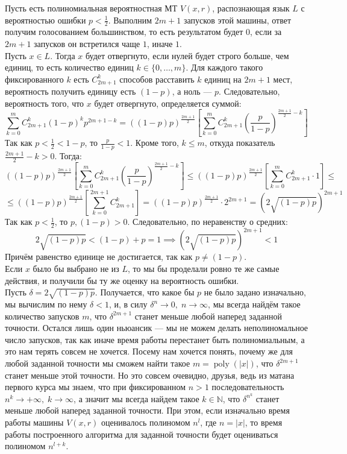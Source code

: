 \documentclass[11pt]{article}
\DeclareMathOperator{\poly}{poly}
\begin{document}
Пусть есть полиномиальная вероятностная МТ $V(x, r)$, распознающая язык $L$ с вероятностью ошибки $p < \frac{1}{2}$. Выполним $2m + 1$ запусков этой машины, ответ получим голосованием большинством, то есть результатом будет $0$, если за $2m + 1$ запусков он встретился чаще $1$, иначе $1$. \\
Пусть $x \in L$. Тогда $x$ будет отвергнуто, если нулей будет строго больше, чем единиц, то есть количество единиц $k \in \{0, \ldots, m\}$. Для каждого такого фиксированного $k$ есть $C_{2m + 1}^k$ способов расставить $k$ единиц на $2m + 1$ мест, вероятность получить единицу есть $(1 - p)$, а ноль --- $p$. Следовательно, вероятность того, что $x$ будет отвергнуто, определяется суммой:
\[\sum_{k = 0}^m C_{2m + 1}^k (1 - p)^k p^{2m + 1 - k} = ((1-p)p)^{\frac{2m + 1}{2}} \left[\sum_{k = 0}^m C_{2m + 1}^k \left(\frac{p}{1 - p}\right)^{\frac{2m + 1}{2} - k}\right]\]
Так как $p < \frac{1}{2} < 1 - p$, то $\frac{p}{1 - p} < 1$.
Кроме того, $k \leq m$, откуда показатель $\frac{2m + 1}{2} - k > 0$. Тогда:
\[((1-p)p)^{\frac{2m + 1}{2}} \left[\sum_{k = 0}^m C_{2m + 1}^k \left(\frac{p}{1 - p}\right)^{\frac{2m + 1}{2} - k}\right] \leq ((1 - p)p)^{\frac{2m + 1}{2}} \left[\sum_{k = 0}^m C_{2m + 1}^k \cdot 1\right] \leq \]
\[\leq ((1 - p)p)^{\frac{2m + 1}{2}} \left[\sum_{k = 0}^{2m + 1} C_{2m + 1}^k\right] = ((1 - p)p)^{\frac{2m + 1}{2}} \cdot 2^{2m + 1} = \left(2\sqrt{(1 - p)p}\right)^{2m + 1}\]
Так как $p < \frac{1}{2}$, то $p, (1 - p) > 0$. Следовательно, по неравенству о средних:
\[2\sqrt{(1 - p)p} < (1 - p) + p = 1 \implies \left(2\sqrt{(1 - p)p}\right)^{2m + 1} < 1\]
Причём равенство единице не достигается, так как $p \neq (1 - p)$. \\
Если $x$ было бы выбрано не из $L$, то мы бы проделали ровно те же самые действия, и получили бы ту же оценку на вероятность ошибки. \\
Пусть $\delta = 2\sqrt{(1 - p)p}$. Получается, что какое бы $p$ не было задано изначально, мы вычислим по нему $\delta < 1$, и, в силу $\delta^n \to 0, \; n \to \infty$, мы всегда найдём такое количество запусков $m$, что $\delta^{2m + 1}$ станет меньше любой наперед заданной точности. Остался лишь один ньюансик --- мы не можем делать неполиномальное число запусков, так как иначе время работы перестанет быть полиномиальным, а это нам терять совсем не хочется. Посему нам хочется понять, почему же для любой заданной точности мы сможем найти такое $m = \poly(\left\lvert x \right\rvert)$, что $\delta^{2m + 1}$ станет меньше этой точности.
Но это совсем очевидно, друзья, ведь из матана первого курса мы знаем, что при фиксированном $n > 1$ последовательность $n^k \to +\infty, \; k \to \infty$, а значит мы всегда найдем такое $k \in \mathbb{N}$, что $\delta^{n^k}$ станет меньше любой наперед заданной точности. При этом, если изначально время работы машины $V(x, r)$ оценивалось полиномом $n^l$, где $n = \left\lvert x \right\rvert$, то время работы построенного алгоритма для заданной точности будет оцениваться полиномом $n^{l + k}$.
\end{document}
